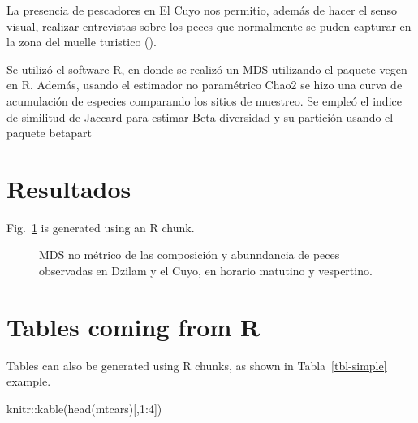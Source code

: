 \documentclass[
  authoryear,
  preprint,
  3p]{elsarticle}
\newenvironment{Shaded}{\begin{snugshade}}{\end{snugshade}}
\newcommand{\DecValTok}[1]{\textcolor[rgb]{0.68,0.00,0.00}{#1}}
\newcommand{\FunctionTok}[1]{\textcolor[rgb]{0.28,0.35,0.67}{#1}}
\newcommand{\NormalTok}[1]{\textcolor[rgb]{0.00,0.23,0.31}{#1}}
\newcommand{\SpecialCharTok}[1]{\textcolor[rgb]{0.37,0.37,0.37}{#1}}
\begin{document}
La presencia de pescadores en El Cuyo nos permitio, además de hacer el
senso visual, realizar entrevistas sobre los peces que normalmente se
puden capturar en la zona del muelle turistico ().

Se utilizó el software R, en donde se realizó un MDS utilizando el
paquete vegen\citep{vegan} en R. Además, usando el estimador no
paramétrico Chao2 \citep{chao2014a} se hizo una curva de acumulación de
especies comparando los sitios de muestreo. Se empleó el indice de
similitud de Jaccard para estimar Beta diversidad y su partición
\citep{baselga2009} usando el paquete betapart \citep{betapart}

\section{Resultados}\label{resultados}

Fig.~\ref{fig-mds} is generated using an R chunk.

\begin{figure}


\caption{\label{fig-mds}MDS no métrico de las composición y abunndancia
de peces observadas en Dzilam y el Cuyo, en horario matutino y
vespertino.}

\end{figure}%

\section{Tables coming from R}\label{tables-coming-from-r}

Tables can also be generated using R chunks, as shown in
Tabla~\ref{tbl-simple} example.

\begin{Shaded}
\begin{Highlighting}[]
\NormalTok{knitr}\SpecialCharTok{::}\FunctionTok{kable}\NormalTok{(}\FunctionTok{head}\NormalTok{(mtcars)[,}\DecValTok{1}\SpecialCharTok{:}\DecValTok{4}\NormalTok{])}
\end{Highlighting}
\end{Shaded}
\end{document}
